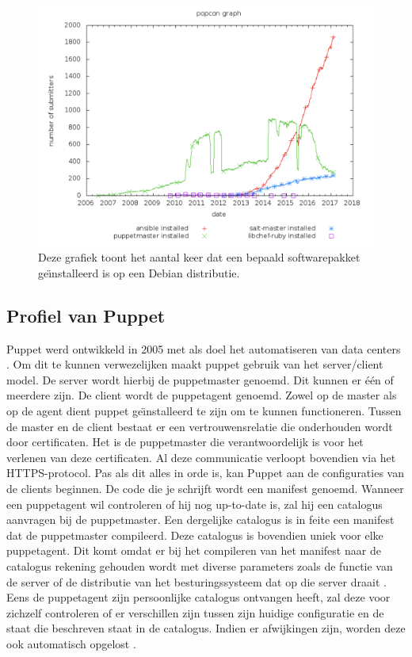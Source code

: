 \begin{figure}
  \includegraphics[width=\linewidth]{img/popcon_everybody.png}
  \caption{Deze grafiek toont het aantal keer dat een bepaald softwarepakket ge\"{\i}nstalleerd is op een Debian distributie. \autocite{popcon}}
  \label{fig:popcon_everybody}
\end{figure}

\subsection{Profiel van Puppet}

Puppet werd ontwikkeld in 2005 met als doel het automatiseren van data centers \autocite{puppetfaq}. Om dit te kunnen verwezelijken maakt puppet gebruik van  het server/client model. De server wordt hierbij de puppetmaster genoemd. Dit kunnen er   \'e\'en of meerdere zijn. De client wordt de puppetagent genoemd. Zowel op de master als op de agent dient puppet ge{\"\i}nstalleerd te zijn om te kunnen functioneren. Tussen de master en de client bestaat er een vertrouwensrelatie die onderhouden wordt door certificaten. Het is de puppetmaster die verantwoordelijk is voor het verlenen van deze certificaten. Al deze communicatie verloopt bovendien via het HTTPS-protocol. Pas als dit alles in orde is, kan Puppet  aan de configuraties van de clients beginnen. De code die je schrijft wordt een manifest genoemd. Wanneer een puppetagent wil controleren of hij nog up-to-date is, zal hij een catalogus aanvragen bij de puppetmaster. Een dergelijke catalogus is in feite een manifest dat de puppetmaster compileerd. Deze catalogus is bovendien uniek voor elke puppetagent. Dit komt omdat er bij het compileren van het manifest naar de catalogus rekening gehouden wordt met diverse parameters zoals de functie van de server of de distributie van het besturingssysteem dat op die server draait \autocite{puppetlanguagecatalog}. Eens de puppetagent zijn persoonlijke catalogus ontvangen heeft, zal deze voor zichzelf controleren of er verschillen zijn tussen zijn huidige configuratie en de staat die beschreven staat in de catalogus. Indien er afwijkingen zijn, worden deze ook automatisch opgelost \autocite{puppetdoc}.


